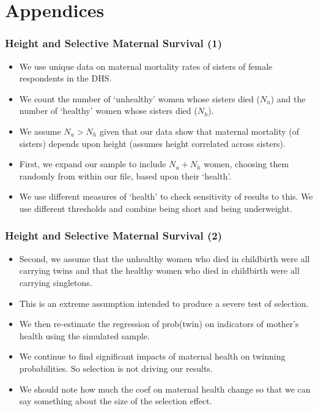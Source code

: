 \documentclass[9pt,letterpaper,subeqn]{beamer}
\begin{document}



\section{Appendices}
\frame{
\begin{center}
\Large \textcolor{blue}{Appendices}
\end{center}
}


\begin{frame}[label=MMRselec]
\frametitle{Height and Selective Maternal Survival (1)} 
\begin{itemize}
\item We use unique data on maternal mortality rates of sisters of female respondents in the DHS.
\item We count the number of `unhealthy' women whose sisters died ($N_u$) and the number of `healthy' women whose sisters died ($N_h$).
\item We assume $N_u > N_h$ given that our data show that maternal mortality (of sisters) depends upon height (assumes height correlated across sisters).
\item First, we expand our sample to include $N_u + N_h$ women, choosing them randomly from within our file, based upon their `health'.
\item We use different measures of `health' to check sensitivity of results to this. We use different thresholds and combine being short and being underweight.
\end{itemize}
\hyperlink{selectest}{}
\end{frame}

\begin{frame}
\frametitle{Height and Selective Maternal Survival (2)}
\begin{itemize}
\item Second, we assume that the unhealthy women who died in childbirth were all carrying twins and that the healthy women who died in childbirth were all carrying singletons. 
\item This is an extreme assumption intended to produce a severe test of selection.
\item We then re-estimate the regression of prob(twin) on indicators of mother's health using the simulated sample.
\item We continue to find significant impacts of maternal health on twinning probabilities. So selection is not driving our results.
\item We should note how much the coef on maternal health change so that we can say something about the size of the selection effect.
\end{itemize}
\hyperlink{selectest}{}
\end{frame}
\end{document}
